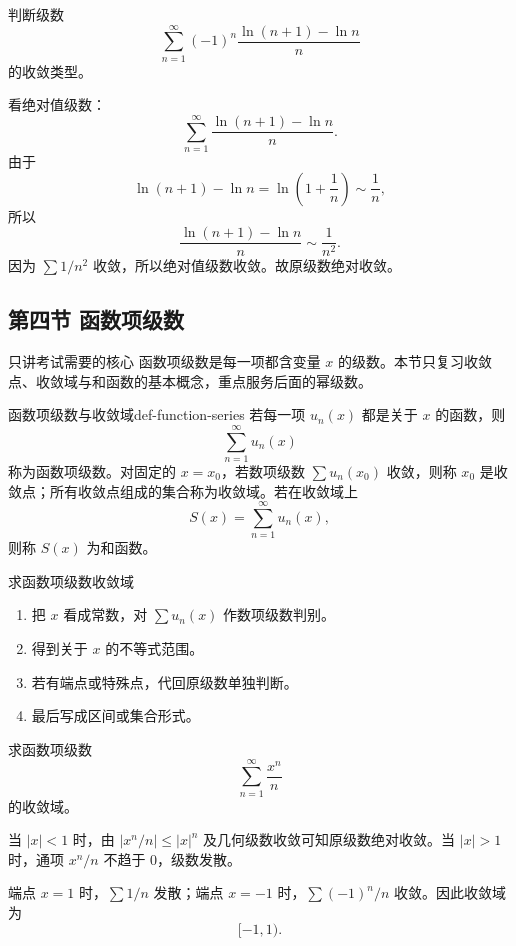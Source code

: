\begin{problem}
判断级数
\[
  \sum_{n=1}^{\infty}(-1)^n\frac{\ln(n+1)-\ln n}{n}
\]
的收敛类型。
\end{problem}
\begin{solution}
看绝对值级数：
\[
  \sum_{n=1}^{\infty}\frac{\ln(n+1)-\ln n}{n}.
\]
由于
\[
  \ln(n+1)-\ln n=\ln\left(1+\frac1n\right)\sim\frac1n,
\]
所以
\[
  \frac{\ln(n+1)-\ln n}{n}\sim\frac1{n^2}.
\]
因为 $\sum 1/n^2$ 收敛，所以绝对值级数收敛。故原级数绝对收敛。
\end{solution}

\subsection{第四节 函数项级数}

\begin{summarybox}{只讲考试需要的核心}
函数项级数是每一项都含变量 $x$ 的级数。本节只复习收敛点、收敛域与和函数的基本概念，重点服务后面的幂级数。
\end{summarybox}

\begin{dy}{函数项级数与收敛域}{def-function-series}
若每一项 $u_n(x)$ 都是关于 $x$ 的函数，则
\[
  \sum_{n=1}^{\infty}u_n(x)
\]
称为函数项级数。对固定的 $x=x_0$，若数项级数 $\sum u_n(x_0)$ 收敛，则称 $x_0$ 是收敛点；所有收敛点组成的集合称为收敛域。若在收敛域上
\[
  S(x)=\sum_{n=1}^{\infty}u_n(x),
\]
则称 $S(x)$ 为和函数。
\end{dy}

\begin{methodbox}{求函数项级数收敛域}
\begin{enumerate}
  \item 把 $x$ 看成常数，对 $\sum u_n(x)$ 作数项级数判别。
  \item 得到关于 $x$ 的不等式范围。
  \item 若有端点或特殊点，代回原级数单独判断。
  \item 最后写成区间或集合形式。
\end{enumerate}
\end{methodbox}

\begin{problem}
求函数项级数
\[
  \sum_{n=1}^{\infty}\frac{x^n}{n}
\]
的收敛域。
\end{problem}
\begin{solution}
当 $|x|<1$ 时，由 $\left|x^n/n\right|\le |x|^n$ 及几何级数收敛可知原级数绝对收敛。当 $|x|>1$ 时，通项 $x^n/n$ 不趋于 $0$，级数发散。

端点 $x=1$ 时，$\sum1/n$ 发散；端点 $x=-1$ 时，$\sum(-1)^n/n$ 收敛。因此收敛域为
\[
  [-1,1).
\]
\end{solution}


